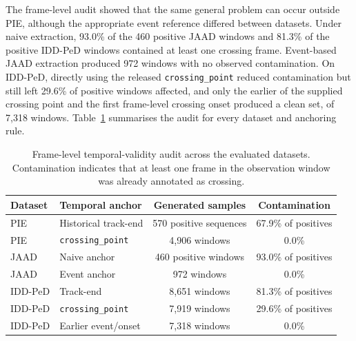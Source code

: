 \documentclass[mti,article,submit,moreauthors]{Definitions/mdpi}
\begin{document}
The frame-level audit showed that the same general problem can occur outside PIE, although the appropriate event reference differed between datasets. Under naive extraction, 93.0\% of the 460 positive JAAD windows and 81.3\% of the positive IDD-PeD windows contained at least one crossing frame. Event-based JAAD extraction produced 972 windows with no observed contamination. On IDD-PeD, directly using the released \texttt{crossing\_point} reduced contamination but still left 29.6\% of positive windows affected, and only the earlier of the supplied crossing point and the first frame-level crossing onset produced a clean set, of 7,318 windows. Table~\ref{tab:temporal-audit} summarises the audit for every dataset and anchoring rule.

\begin{table}[htbp]
\centering
\caption{Frame-level temporal-validity audit across the evaluated datasets. Contamination
indicates that at least one frame in the observation window was already annotated as
crossing.}
\label{tab:temporal-audit}
\begin{tabular}{llcc}
\toprule
\textbf{Dataset} & \textbf{Temporal anchor} &
\textbf{Generated samples} & \textbf{Contamination} \\
\midrule
PIE & Historical track-end & 570 positive sequences & 67.9\% of positives \\
PIE & \texttt{crossing\_point} & 4,906 windows & 0.0\% \\
JAAD & Naive anchor & 460 positive windows & 93.0\% of positives \\
JAAD & Event anchor & 972 windows & 0.0\% \\
IDD-PeD & Track-end & 8,651 windows & 81.3\% of positives \\
IDD-PeD & \texttt{crossing\_point} & 7,919 windows & 29.6\% of positives \\
IDD-PeD & Earlier event/onset & 7,318 windows & 0.0\% \\
\bottomrule
\end{tabular}
\end{table}
\end{document}

